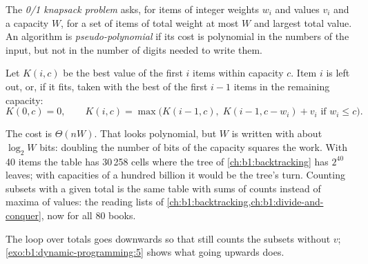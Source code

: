 \begin{definition}\label{def:b1:dynamic-programming:knapsack}
The \emph{0/1 knapsack problem} asks, for items of integer weights $w_i$ and values $v_i$
and a capacity $W$, for a set of items of total weight at most $W$ and largest total value. An algorithm is
\emph{pseudo-polynomial} if its cost is polynomial in the numbers of the input, but
not in the number of digits needed to write them.
\end{definition}

Let $K(i, c)$ be the best value of the first $i$ items within capacity $c$. Item $i$ is left out, or, if it fits, taken
with the best of the first $i - 1$ items in the remaining capacity:
\[ K(0, c) = 0, \qquad K(i, c) = \max\bigl(K(i - 1, c),\; K(i - 1, c - w_i) + v_i \text{ if } w_i \leq c\bigr). \]

\label{lst:b1:dynamic-programming:knapsack}

\label{out:b1:dynamic-programming:knapsack}

The cost is $\Theta(nW)$. That looks polynomial, but $W$ is written with about $\log_2 W$ bits: doubling the number of
bits of the capacity squares the work. With 40 items the table has 30\,258 cells where the tree of
\cref{ch:b1:backtracking} has $2^{40}$ leaves; with capacities of a hundred billion it would be the tree's turn. Counting
subsets with a given total is the same table with sums of counts instead of maxima of values: the reading lists of
\cref{ch:b1:backtracking,ch:b1:divide-and-conquer}, now for all 80 books.

\label{lst:b1:dynamic-programming:subset-sum}

\label{out:b1:dynamic-programming:subset-sum}

The loop over totals goes downwards so that  still counts the subsets without $v$;
\cref{exo:b1:dynamic-programming:5} shows what going upwards does.

